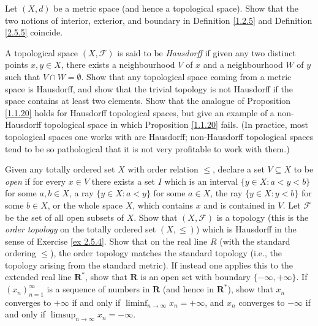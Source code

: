\begin{exercise}\label{ex 2.5.3}
    Let \((X, d)\) be a metric space (and hence a topological space).
    Show that the two notions of interior, exterior, and boundary in Definition
    \ref{1.2.5} and Definition \ref{2.5.5} coincide.
\end{exercise}

\begin{exercise}\label{ex 2.5.4}
    A topological space \((X, \mathcal{F})\) is said to be \emph{Hausdorff} if given any two distinct points \(x, y \in X\), there exists a neighbourhood \(V\) of \(x\) and a neighbourhood \(W\) of \(y\) such that \(V \cap W = \emptyset\).
    Show that any topological space coming from a metric space is Hausdorff, and show that the trivial topology is not Hausdorff if the space contains at least two elements.
    Show that the analogue of Proposition \ref{1.1.20} holds for Hausdorff topological spaces, but give an example of a non-Hausdorff topological space in which Proposition \ref{1.1.20} fails.
    (In practice, most topological spaces one works with are Hausdorff;
    non-Hausdorff topological spaces tend to be so pathological that it is not very profitable to work with them.)
\end{exercise}

\begin{exercise}\label{ex 2.5.5}
    Given any totally ordered set \(X\) with order relation \(\leq\), declare a set \(V \subseteq X\) to be \emph{open} if for every \(x \in V\) there exists a set \(I\) which is an interval \(\{y \in X : a < y < b\}\) for some \(a, b \in X\), a ray \(\{y \in X : a < y\}\) for some \(a \in X\), the ray \(\{y \in X : y < b\}\) for some \(b \in X\), or the whole space \(X\), which contains \(x\) and is contained in \(V\).
    Let \(\mathcal{F}\) be the set of all open subsets of \(X\).
    Show that \((X, \mathcal{F})\) is a topology (this is the \emph{order topology} on the totally ordered set \((X, \leq)\)) which is Hausdorff in the sense of Exercise \ref{ex 2.5.4}.
    Show that on the real line \(R\) (with the standard ordering \(\leq\)), the order topology matches the standard topology (i.e., the topology arising from the standard metric).
    If instead one applies this to the extended real line \(\mathbf{R}^*\), show that \(\mathbf{R}\) is an open set with boundary \(\{-\infty, +\infty\}\).
    If \((x_n)_{n = 1}^\infty\) is a sequence of numbers in \(\mathbf{R}\) (and hence in \(\mathbf{R}^*\)), show that \(x_n\) converges to \(+\infty\) if and only if \(\liminf_{n \to \infty} x_n = +\infty\), and \(x_n\) converges to \(-\infty\) if and only if \(\limsup_{n \to \infty} x_n = -\infty\).
\end{exercise}

